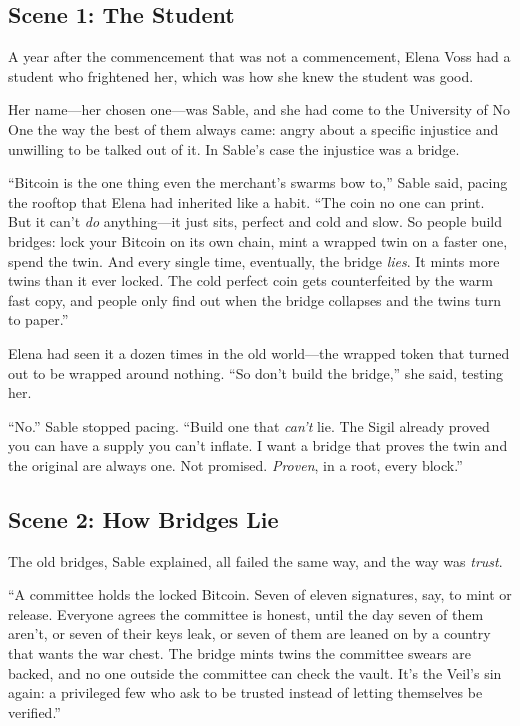 \documentclass[12pt,letterpaper]{book}
\begin{document}
\hypertarget{scene-1-the-student}{%
\subsection{Scene 1: The
Student}\label{scene-1-the-student}}

A year after the commencement that was not a commencement, Elena Voss had a
student who frightened her, which was how she knew the student was good.

Her name---her chosen one---was Sable, and she had come to the University of No
One the way the best of them always came: angry about a specific injustice and
unwilling to be talked out of it. In Sable's case the injustice was a bridge.

``Bitcoin is the one thing even the merchant's swarms bow to,'' Sable said,
pacing the rooftop that Elena had inherited like a habit. ``The coin no one can
print. But it can't \emph{do} anything---it just sits, perfect and cold and slow.
So people build bridges: lock your Bitcoin on its own chain, mint a wrapped twin
on a faster one, spend the twin. And every single time, eventually, the bridge
\emph{lies}. It mints more twins than it ever locked. The cold perfect coin gets
counterfeited by the warm fast copy, and people only find out when the bridge
collapses and the twins turn to paper.''

Elena had seen it a dozen times in the old world---the wrapped token that turned
out to be wrapped around nothing. ``So don't build the bridge,'' she said,
testing her.

``No.'' Sable stopped pacing. ``Build one that \emph{can't} lie. The Sigil already
proved you can have a supply you can't inflate. I want a bridge that proves the
twin and the original are always one. Not promised. \emph{Proven}, in a root,
every block.''

\hypertarget{scene-2-how-bridges-lie}{%
\subsection{Scene 2: How Bridges
Lie}\label{scene-2-how-bridges-lie}}

The old bridges, Sable explained, all failed the same way, and the way was
\emph{trust}.

``A committee holds the locked Bitcoin. Seven of eleven signatures, say, to mint
or release. Everyone agrees the committee is honest, until the day seven of them
aren't, or seven of their keys leak, or seven of them are leaned on by a country
that wants the war chest. The bridge mints twins the committee swears are backed,
and no one outside the committee can check the vault. It's the Veil's sin again:
a privileged few who ask to be trusted instead of letting themselves be
verified.''
\end{document}
